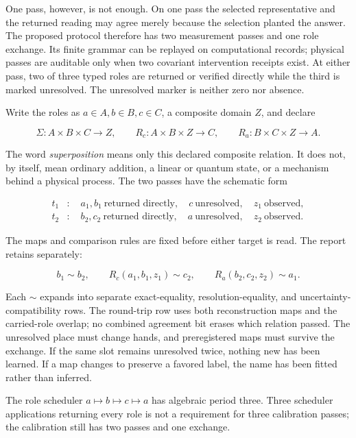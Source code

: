 \documentclass[12pt,oneside]{book}
\begin{document}
One pass, however, is not enough. On one pass the selected representative and the returned reading may agree merely
because the selection planted the answer. The proposed protocol therefore has two measurement passes and one role
exchange. Its finite grammar can be replayed on computational records; physical passes are auditable only when two
covariant intervention receipts exist. At either pass, two of three typed roles are returned or verified directly
while the third is marked unresolved. The unresolved marker is neither zero nor absence.

Write the roles as \(a\in A,b\in B,c\in C\), a composite domain \(Z\), and declare

\[
\Sigma:A\times B\times C\to Z,\qquad
R_c:A\times B\times Z\to C,\qquad
R_a:B\times C\times Z\to A.
\]

The word \emph{superposition} means only this declared composite relation. It does not, by itself, mean ordinary
addition, a linear or quantum state, or a mechanism behind a physical process. The two passes have the schematic form

\[
\begin{aligned}
t_1 &: \quad a_1,b_1\ \text{returned directly},\quad c\ \text{unresolved},\quad z_1\ \text{observed},\\
t_2 &: \quad b_2,c_2\ \text{returned directly},\quad a\ \text{unresolved},\quad z_2\ \text{observed}.
\end{aligned}
\]

The maps and comparison rules are fixed before either target is read. The report retains separately:

\[
b_1 \sim b_2,\qquad
R_c(a_1,b_1,z_1)\sim c_2,\qquad
R_a(b_2,c_2,z_2)\sim a_1.
\]

Each \(\sim\) expands into separate exact-equality, resolution-equality, and uncertainty-compatibility rows. The
round-trip row uses both reconstruction maps and the carried-role overlap; no combined agreement bit erases which
relation passed. The unresolved place must change hands, and preregistered maps must survive the exchange. If the same
slot remains unresolved twice, nothing new has been learned. If a map changes to preserve a favored label, the name
has been fitted rather than inferred.

The role scheduler \(a\mapsto b\mapsto c\mapsto a\) has algebraic period three. Three scheduler applications returning
every role is not a requirement for three calibration passes; the calibration still has two passes and one exchange.
\end{document}
